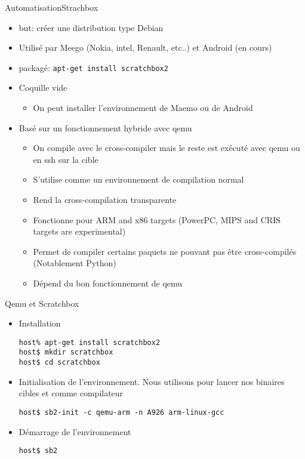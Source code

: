 \begin{frame}[fragile=singleslide]{Automatisation}{Strachbox}
  \begin{itemize}
  \item but: créer une distribution type Debian
  \item Utilisé  par Meego (Nokia,  intel, Renault, etc..)  et Android
    (en cours)
  \item packagé: \verb+apt-get install scratchbox2+
  \item Coquille vide
    \begin{itemize}
    \item On peut installer l'environnement de Maemo ou de Android
    \end{itemize}
  \item Basé sur un fonctionnement hybride avec qemu
    \begin{itemize}
    \item On compile avec le  cross-compiler mais le reste est exécuté
      avec qemu ou en ssh sur la cible
    \item S'utilise comme un environnement de compilation normal
    \item Rend la cross-compilation transparente
    \item Fonctionne pour ARM and  x86 targets (PowerPC, MIPS and CRIS
      targets are experimental)
    \item  Permet de  compiler certains  paquets ne  pouvant  pas être
      cross-compilés (Notablement Python)
    \item Dépend du bon fonctionnement de qemu
    \end{itemize}
  \end{itemize}
\end{frame}

\begin{frame}[fragile=singleslide]{Qemu et Scratchbox}
  \begin{itemize} 
  \item Installation
    \begin{lstlisting}
host% apt-get install scratchbox2
host$ mkdir scratchbox
host$ cd scratchbox
    \end{lstlisting}
  \item Initialisation de l'environnement. Nous utilisons  pour
    lancer nos binaires cibles et  comme compilateur
    \begin{lstlisting} 
host$ sb2-init -c qemu-arm -n A926 arm-linux-gcc
    \end{lstlisting}
  \item Démarrage de l'environnement 
    \begin{lstlisting} 
host$ sb2
    \end{lstlisting}
  \end{itemize}
\end{frame}

